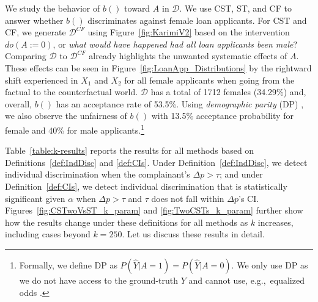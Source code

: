 We study the behavior of $b()$ toward $A$ in $\mathcal{D}$.
We use CST, ST, and CF to answer whether $b()$ discriminates against female loan applicants.
For CST and CF, we generate $\mathcal{D}^{CF}$ using Figure~\ref{fig:KarimiV2} based on the intervention $do(A:=0)$, or \textit{what would have happened had all loan applicants been male}? 
Comparing $\mathcal{D}$ to $\mathcal{D}^{CF}$ already highlights the unwanted systematic effects of $A$. 
These effects can be seen in Figure~\ref{fig:LoanApp_Distributions} by the rightward shift experienced in $X_1$ and $X_2$ for all female applicants when going from the factual to the counterfactual world.
$\mathcal{D}$ has a total of 1712 females (34.29\%) and, overall, $b()$ has an acceptance rate of 53.5\%.
Using \textit{demographic parity} (DP) \parencite{Kamiran2009_ClassifyingWihtoutDiscriminating}, we also observe the unfairness of $b()$ with 13.5\% acceptance probability for female and 40\% for male applicants.\footnote{\label{foot:dp}Formally, we define DP as $P(\hat{Y}|A=1) = P(\hat{Y}|A=0)$. We only use DP as we do not have access to the ground-truth $Y$ and cannot use, e.g.,~equalized odds \parencite{DBLP:conf/nips/HardtPNS16}.}

Table~\ref{table:k-results} reports the results for all methods based on Definitions~\ref{def:IndDisc} and \ref{def:CIs}.
Under Definition~\ref{def:IndDisc}, we detect individual discrimination when the complainant's $\Delta p > \tau$; and under Definition~\ref{def:CIs}, we detect individual discrimination that is statistically significant given $\alpha$ when $\Delta p > \tau$ and $\tau$ does not fall within $\Delta p$'s CI.
Figures~\ref{fig:CSTwoVsST_k_param}
and \ref{fig:TwoCSTs_k_param} further show how the results change under these definitions for all methods as $k$ increases, including cases beyond $k=250$.
Let us discuss these results in detail.

